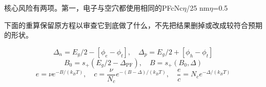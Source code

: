 \documentclass[11pt,a4paper]{article}
\begin{document}
\par
{\cjkfont 核心风险有两项。第一，电子与空穴都使用相同的}\allowbreak{}PF\allowbreak{}cNc\ensuremath{\eta}/2\allowbreak{}5 nm\allowbreak{}\ensuremath{\eta}=\allowbreak{}0.5\allowbreak{}
\par
{\cjkfont 下面的重算保留原方程以审查它到底做了什么，不先把结果删掉或改成较符合预期的形状。}\allowbreak{}
\par
\begin{equation}
\Delta_n=E_g/2-[\phi_e-\phi_t],\quad\Delta_p=E_g/2+[\phi_h-\phi_t]
\label{eq:24}\end{equation}
\begin{equation}
B_0=s_+(E_g/2-\Delta_{\mathrm{PF}}),\quad B=s_+(B_0,\Delta)
\label{eq:25}\end{equation}
\begin{equation}
e=\nu e^{-B/(k_BT)},\quad c=\frac{\nu}{N_c}e^{-(B-\Delta)/(k_BT)},\quad\frac{e}{c}=N_c e^{-\Delta/(k_BT)}
\label{eq:26}\end{equation}
\end{document}
